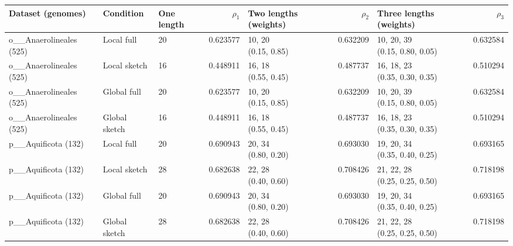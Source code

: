 \begin{longtable}{lllr lrlr}
\toprule
Dataset (genomes) & Condition & One length & $\rho_1$ & Two lengths (weights) & $\rho_2$ & Three lengths (weights) & $\rho_3$ \\
\midrule
\endhead
o\_\_Anaerolineales (525) & Local full & 20 & 0.623577 & \shortstack[l]{10, 20\\(0.15, 0.85)} & 0.632209 & \shortstack[l]{10, 20, 39\\(0.15, 0.80, 0.05)} & 0.632584 \\
o\_\_Anaerolineales (525) & Local sketch & 16 & 0.448911 & \shortstack[l]{16, 18\\(0.55, 0.45)} & 0.487737 & \shortstack[l]{16, 18, 23\\(0.35, 0.30, 0.35)} & 0.510294 \\
o\_\_Anaerolineales (525) & Global full & 20 & 0.623577 & \shortstack[l]{10, 20\\(0.15, 0.85)} & 0.632209 & \shortstack[l]{10, 20, 39\\(0.15, 0.80, 0.05)} & 0.632584 \\
o\_\_Anaerolineales (525) & Global sketch & 16 & 0.448911 & \shortstack[l]{16, 18\\(0.55, 0.45)} & 0.487737 & \shortstack[l]{16, 18, 23\\(0.35, 0.30, 0.35)} & 0.510294 \\
p\_\_Aquificota (132) & Local full & 20 & 0.690943 & \shortstack[l]{20, 34\\(0.80, 0.20)} & 0.693030 & \shortstack[l]{19, 20, 34\\(0.35, 0.40, 0.25)} & 0.693165 \\
p\_\_Aquificota (132) & Local sketch & 28 & 0.682638 & \shortstack[l]{22, 28\\(0.40, 0.60)} & 0.708426 & \shortstack[l]{21, 22, 28\\(0.25, 0.25, 0.50)} & 0.718198 \\
p\_\_Aquificota (132) & Global full & 20 & 0.690943 & \shortstack[l]{20, 34\\(0.80, 0.20)} & 0.693030 & \shortstack[l]{19, 20, 34\\(0.35, 0.40, 0.25)} & 0.693165 \\
p\_\_Aquificota (132) & Global sketch & 28 & 0.682638 & \shortstack[l]{22, 28\\(0.40, 0.60)} & 0.708426 & \shortstack[l]{21, 22, 28\\(0.25, 0.25, 0.50)} & 0.718198 \\

\end{longtable}
